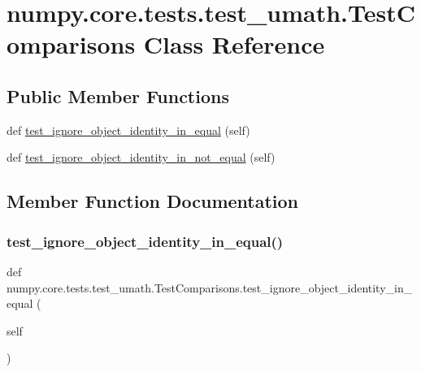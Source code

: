 \hypertarget{classnumpy_1_1core_1_1tests_1_1test__umath_1_1TestComparisons}{}\section{numpy.\+core.\+tests.\+test\+\_\+umath.\+Test\+Comparisons Class Reference}
\label{classnumpy_1_1core_1_1tests_1_1test__umath_1_1TestComparisons}
\subsection*{Public Member Functions}
\begin{DoxyCompactItemize}
\item 
def \hyperlink{classnumpy_1_1core_1_1tests_1_1test__umath_1_1TestComparisons_a15493c6d5539874d60f7f486a4337ec6}{test\+\_\+ignore\+\_\+object\+\_\+identity\+\_\+in\+\_\+equal} (self)
\item 
def \hyperlink{classnumpy_1_1core_1_1tests_1_1test__umath_1_1TestComparisons_ad5c0ce119e6b18e6681ae57c80232c00}{test\+\_\+ignore\+\_\+object\+\_\+identity\+\_\+in\+\_\+not\+\_\+equal} (self)
\end{DoxyCompactItemize}


\subsection{Member Function Documentation}
\mbox{\label{classnumpy_1_1core_1_1tests_1_1test__umath_1_1TestComparisons_a15493c6d5539874d60f7f486a4337ec6}} 
\subsubsection{\texorpdfstring{test\+\_\+ignore\+\_\+object\+\_\+identity\+\_\+in\+\_\+equal()}{test\_ignore\_object\_identity\_in\_equal()}}
{\footnotesize\ttfamily def numpy.\+core.\+tests.\+test\+\_\+umath.\+Test\+Comparisons.\+test\+\_\+ignore\+\_\+object\+\_\+identity\+\_\+in\+\_\+equal (\begin{DoxyParamCaption}\item[{}]{self }\end{DoxyParamCaption})}

